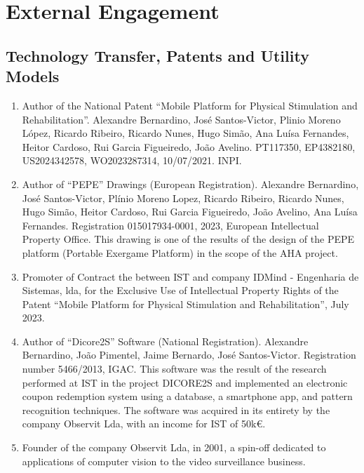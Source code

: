 \documentclass[
]{article}
\begin{document}
\section{External Engagement}\label{external-engagement-1}

\subsection{Technology Transfer, Patents and Utility
Models}\label{technology-transfer-patents-and-utility-models}

\begin{enumerate}
\def\labelenumi{\arabic{enumi}.}
\item
  Author of the National Patent ``Mobile Platform for Physical
  Stimulation and Rehabilitation''. Alexandre Bernardino, José
  Santos-Victor, Plinio Moreno López, Ricardo Ribeiro, Ricardo Nunes,
  Hugo Simão, Ana Luísa Fernandes, Heitor Cardoso, Rui Garcia
  Figueiredo, João Avelino. PT117350, EP4382180, US2024342578,
  WO2023287314, 10/07/2021. INPI.
\item
  Author of ``PEPE'' Drawings (European Registration). Alexandre
  Bernardino, José Santos-Victor, Plínio Moreno Lopez, Ricardo Ribeiro,
  Ricardo Nunes, Hugo Simão, Heitor Cardoso, Rui Garcia Figueiredo, João
  Avelino, Ana Luísa Fernandes. Registration 015017934-0001, 2023,
  European Intellectual Property Office. This drawing is one of the
  results of the design of the PEPE platform (Portable Exergame
  Platform) in the scope of the AHA project.
\item
  Promoter of Contract the between IST and company IDMind - Engenharia
  de Sistemas, lda, for the Exclusive Use of Intellectual Property
  Rights of the Patent ``Mobile Platform for Physical Stimulation and
  Rehabilitation'', July 2023.
\item
  Author of ``Dicore2S'' Software (National Registration). Alexandre
  Bernardino, João Pimentel, Jaime Bernardo, José Santos-Victor.
  Registration number 5466/2013, IGAC. This software was the result of
  the research performed at IST in the project DICORE2S and implemented
  an electronic coupon redemption system using a database, a smartphone
  app, and pattern recognition techniques. The software was acquired in
  its entirety by the company Observit Lda, with an income for IST of
  50k€.
\item
  Founder of the company Observit Lda, in 2001, a spin-off dedicated to
  applications of computer vision to the video surveillance business.
\end{enumerate}
\end{document}
